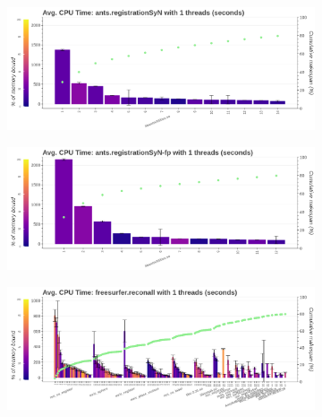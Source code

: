 \documentclass[conference]{IEEEtran}
\begin{document}
\begin{figure}[ht!]
	\begin{subfigure}[t]{0.49\textwidth}
		\caption{}
		\label{subfig:hotspots-ants-registrationSyN}
		\includegraphics[width=\textwidth]{figures/hotspots-1thread-ants-registrationSyN.png}
	\end{subfigure}
	\hfill
	\begin{subfigure}[t]{0.49\textwidth}
		\caption{}
		\label{subfig:hotspots-ants-registrationSyN-fp}
		\includegraphics[width=\textwidth]{figures/hotspots-1thread-ants-registrationSyN-fp.png}
	\end{subfigure}
																																																																				
	\begin{subfigure}[t]{\textwidth}
		\caption{}
		\label{subfig:hotspots-1thread-freesurfer-reconall}
		\includegraphics[width=\textwidth]{figures/hotspots-1thread-freesurfer-reconall.png}
	\end{subfigure}
																																																																				

\end{figure}
\end{document}
